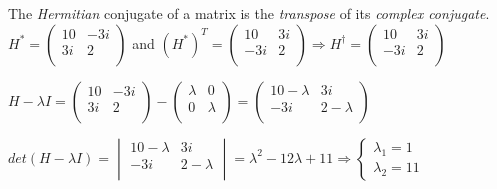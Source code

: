 \documentclass[fleqn]{article}
\begin{document}
\begin{enumerate}
      \bigbreak

      \textcolor{hwColor}{
        The \emph{Hermitian} conjugate of a matrix is the \emph{transpose} of its \emph{complex conjugate}. \\
        $
          H^*=\begin{pmatrix}
            10 & -3i \\
            3i & 2 \\
          \end{pmatrix}
        $ and 
        $
          (H^*)^T=\begin{pmatrix}
            10 & 3i \\
            -3i & 2 \\
          \end{pmatrix}
          \Longrightarrow
          H^\dagger=\begin{pmatrix}
            10 & 3i \\
            -3i & 2 \\
          \end{pmatrix}
        $
      }

      \textcolor{hwColor}{
        $
          H-\lambda I=\begin{pmatrix}
            10 & -3i \\
            3i & 2 \\
          \end{pmatrix}-\begin{pmatrix}
            \lambda & 0 \\
            0 & \lambda \\
          \end{pmatrix}=\begin{pmatrix}
            10-\lambda & 3i \\
            -3i & 2-\lambda \\
          \end{pmatrix}
        $
      }

      \textcolor{hwColor}{
        $
         det(H-\lambda I)=\begin{vmatrix}
          10-\lambda & 3i \\
          -3i & 2-\lambda \\
         \end{vmatrix}=\lambda^2-12\lambda+11 \Longrightarrow 
         \begin{cases}
           \lambda_1=1 \\
           \lambda_2=11
         \end{cases}
        $
      }


\end{enumerate}
\end{document}
